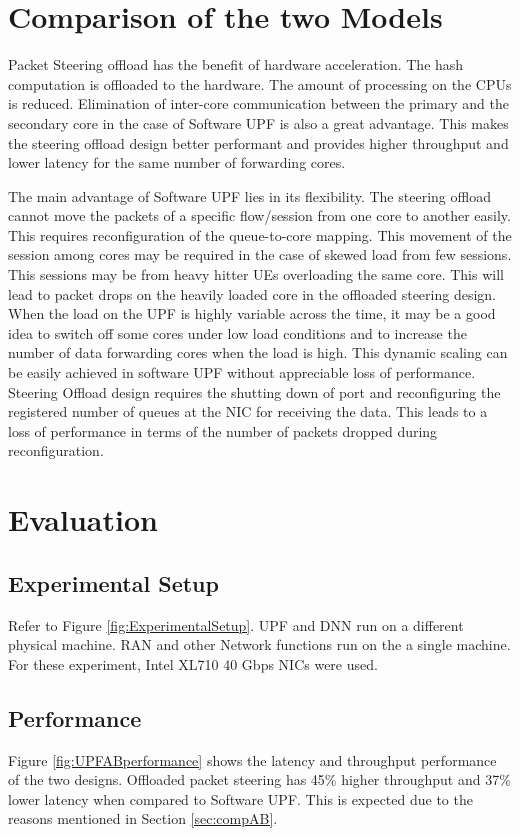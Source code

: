 \section{Comparison of the two Models \label{sec:compAB}}
Packet Steering offload has the benefit of hardware acceleration. The hash computation is offloaded to the hardware. The amount of processing on the CPUs is reduced. Elimination of inter-core communication between the primary and the secondary core in the case of Software UPF is also a great advantage. This makes the steering offload design better performant and provides higher throughput and lower latency for the same number of forwarding cores.

The main advantage of Software UPF lies in its flexibility. The steering offload cannot move the packets of a specific flow/session from one core to another easily. This requires reconfiguration of the queue-to-core mapping.
This movement of the session among cores may be required in the case of skewed load from few sessions. This sessions may be from heavy hitter UEs overloading the same core. This will lead to packet drops on the heavily loaded core in the offloaded steering design.
When the load on the UPF is highly variable across the time, it may be a good idea to switch off some cores under low load conditions and to increase the number of  data
forwarding cores when the load is high. This dynamic scaling can be easily
achieved in software UPF without appreciable loss of performance. Steering Offload design requires the shutting down of port and reconfiguring the registered number of queues at the NIC for receiving the data. This leads to a loss of performance in terms of the number of packets dropped during reconfiguration.

\section{Evaluation}
\subsection{Experimental Setup}
Refer to Figure \ref{fig:ExperimentalSetup}. UPF and DNN run on a different physical machine. RAN and other Network functions run on the a single machine. For these experiment, Intel XL710 40 Gbps NICs were used.
\subsection{Performance}
Figure \ref{fig:UPFABperformance} shows the latency and throughput performance of the two designs.
Offloaded packet steering has 45\% higher throughput and 37\% lower latency when compared to Software UPF. This is expected due to the reasons mentioned in Section \ref{sec:compAB}.

